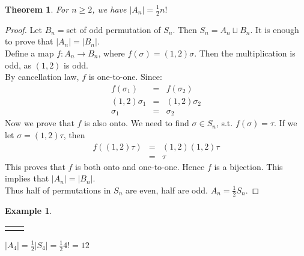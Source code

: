 \documentclass{article}
\theoremstyle{MyNonumberplain}
\theoremstyle{break}
\newtheorem*{proof}{Proof. }
\newcommand{\nline}{\begin{tabular}{ll}&\\\end{tabular}}
\theoremstyle{break}
\newtheorem{theorem}{Theorem}[section]
\newtheorem{example}{Example}[section]
\theoremstyle{break}
\theoremstyle{definition}
\theoremstyle{break}
\begin{document}
\begin{thmbox}
    \begin{theorem}
        For $n \geq 2$, we have $| A_n | = \frac{1}{2} n!$
    \end{theorem}
    \begin{prfbox}
        \begin{proof}
            Let $B_n =$set of odd permutation of $S_n$. Then $S_n = A_n  \sqcup B_n$. It
            is enough to prove that $| A_n | = | B_n |$.\\

            Define a map $f : A_n \rightarrow B_n$, where $f (\sigma) = (1, 2) \sigma$.
            Then the multiplication is odd, as $(1, 2)$ is odd.\\

            By cancellation law, $f$ is one-to-one. Since:
            \begin{eqnarray*}
            f (\sigma_1) & = & f (\sigma_2)\\
            (1, 2) \sigma_1 & = & (1, 2) \sigma_2\\
            \sigma_1 & = & \sigma_2
            \end{eqnarray*}
            Now we prove that $f$ is also onto. We need to find $\sigma \in S_n$, s.t. $f
            (\sigma) = \tau$. If we let $\sigma = (1, 2) \tau$, then
            \begin{eqnarray*}
            f ((1, 2) \tau) & = & (1, 2) (1, 2) \tau\\
            & = & \tau
            \end{eqnarray*}
            This proves that $f$ is both onto and one-to-one. Hence $f$ is a bijection.
            This implies that $| A_n | = | B_n |$.\\

            Thus half of permutations in $S_n$ are even, half are odd. $A_n = \frac{1}{2}
            S_n$.
        \end{proof}
    \end{prfbox}
\end{thmbox}

\begin{expbox}
    \begin{example}

        \nline

        $| A_4 | = \frac{1}{2} | S_4 | = \frac{1}{2} 4! = 12$
    \end{example}
\end{expbox}
\end{document}
